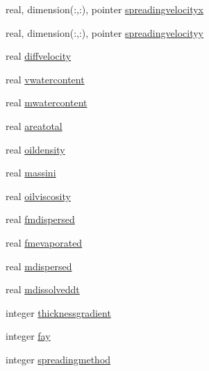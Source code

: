 \begin{DoxyCompactItemize}
\item 
real, dimension(\+:,\+:), pointer \mbox{\hyperlink{structmodulelagrangian_1_1t__externalvar_a659b72dbc30186bc460823ba6849ef29}{spreadingvelocityx}}
\item 
real, dimension(\+:,\+:), pointer \mbox{\hyperlink{structmodulelagrangian_1_1t__externalvar_a168c1c7444490c0d3e6b442bf65a97b6}{spreadingvelocityy}}
\item 
real \mbox{\hyperlink{structmodulelagrangian_1_1t__externalvar_a7206cef10c4f9e0a0da3a6743202aef9}{diffvelocity}}
\item 
real \mbox{\hyperlink{structmodulelagrangian_1_1t__externalvar_a0db758f4ddf4187241eb0e3e54a921b9}{vwatercontent}}
\item 
real \mbox{\hyperlink{structmodulelagrangian_1_1t__externalvar_a62d7bb9730ca5a05f420788ae084de80}{mwatercontent}}
\item 
real \mbox{\hyperlink{structmodulelagrangian_1_1t__externalvar_a67d3f346a03b5546e153049f93fae25d}{areatotal}}
\item 
real \mbox{\hyperlink{structmodulelagrangian_1_1t__externalvar_acab0f61d9ebd00ded897169096177ccf}{oildensity}}
\item 
real \mbox{\hyperlink{structmodulelagrangian_1_1t__externalvar_afdee101b5e740705f4bec78910dd56ad}{massini}}
\item 
real \mbox{\hyperlink{structmodulelagrangian_1_1t__externalvar_afeaa546c600614f5fa652b2f1ea0f279}{oilviscosity}}
\item 
real \mbox{\hyperlink{structmodulelagrangian_1_1t__externalvar_a03508e0ff042f145dfa9ad0224308234}{fmdispersed}}
\item 
real \mbox{\hyperlink{structmodulelagrangian_1_1t__externalvar_a2cb7a822225ce065e6d7b8b79927b785}{fmevaporated}}
\item 
real \mbox{\hyperlink{structmodulelagrangian_1_1t__externalvar_ace481827b09a076f491147af10f540f7}{mdispersed}}
\item 
real \mbox{\hyperlink{structmodulelagrangian_1_1t__externalvar_a869f572b5292072c3334c9120f3e78b7}{mdissolveddt}}
\item 
integer \mbox{\hyperlink{structmodulelagrangian_1_1t__externalvar_a8c1ebc54747c552dff1755889adb717b}{thicknessgradient}}
\item 
integer \mbox{\hyperlink{structmodulelagrangian_1_1t__externalvar_a498fe117a3090cf416dd0732579cba27}{fay}}
\item 
integer \mbox{\hyperlink{structmodulelagrangian_1_1t__externalvar_a2c5d85b02e00d923c0ca336ce1244740}{spreadingmethod}}

\end{DoxyCompactItemize}
